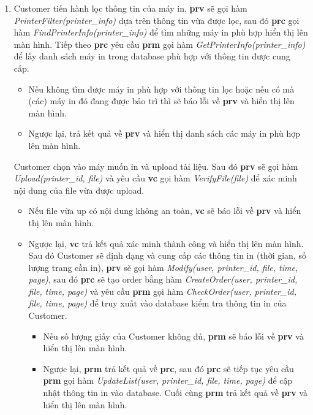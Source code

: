 \begin{enumerate} [1. ]
     \item Customer tiến hành lọc thông tin của máy in, \textbf{prv} sẽ gọi hàm \textit{PrinterFilter(printer\_info)} dựa trên thông tin vừa được lọc, sau đó \textbf{prc} gọi hàm \textit{FindPrinterInfo(printer\_info)} để tìm những máy in phù hợp hiển thị lên màn hình. Tiếp theo \textbf{prc} yêu cầu \textbf{prm} gọi hàm \textit{GetPrinterInfo(printer\_info)} để lấy danh sách máy in trong database phù hợp với thông tin được cung cấp.
     \begin{itemize}
         \item Nếu không tìm được máy in phù hợp với thông tin lọc hoặc nếu có mà (các) máy in đó đang được bảo trì thì sẽ báo lỗi về \textbf{prv} và hiển thị lên màn hình.
         \item Ngược lại, trả kết quả về \textbf{prv} và hiển thị danh sách các máy in phù hợp lên màn hình.
     \end{itemize}
     Customer chọn vào máy muốn in và upload tài liệu. Sau đó \textbf{prv} sẽ gọi hàm \textit{Upload(printer\_id, file)} và yêu cầu \textbf{vc} gọi hàm \textit{VerifyFile(file)} để xác minh nội dung của file vừa được upload.
     \begin{itemize}
         \item Nếu file vừa up có nội dung không an toàn, \textbf{vc} sẽ báo lỗi về \textbf{prv} và hiển thị lên màn hình.
         \item Ngược lại, \textbf{vc} trả kết quả xác minh thành công và hiển thị lên màn hình. Sau đó Customer sẽ định dạng và cung cấp các thông tin in (thời gian, số lượng trang cần in), \textbf{prv} sẽ gọi hàm \textit{Modify(user, printer\_id, file, time, page)}, sau đó \textbf{prc} sẽ tạo order bằng hàm \textit{CreateOrder(user, printer\_id, file, time, page)} và yêu cầu \textbf{prm} gọi hàm \textit{CheckOrder(user, printer\_id, file, time, page)} để truy xuất vào database kiểm tra thông tin in của Customer.
         \begin{itemize}
             \item Nếu số lượng giấy của Customer không đủ, \textbf{prm} sẽ báo lỗi về \textbf{prv} và hiển thị lên màn hình.
             \item Ngược lại, \textbf{prm} trả kết quả về \textbf{prc}, sau đó \textbf{prc} sẽ tiếp tục yêu cầu \textbf{prm} gọi hàm \textit{UpdateList(user, printer\_id, file, time, page)} để cập nhật thông tin in vào database. Cuối cùng \textbf{prm} trả kết quả về \textbf{prv} và hiển thị lên màn hình.
         \end{itemize}
     \end{itemize}
\end{enumerate}

